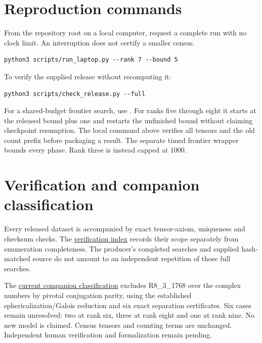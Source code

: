 \documentclass[11pt,a4paper]{article}
\theoremstyle{definition}\newtheorem{definition}[theorem]{Definition}\newtheorem{remark}[theorem]{Remark}
\begin{document}
\par\noindent\begin{minipage}{\linewidth}
\section{Reproduction commands}
From the repository root on a local computer, request a complete run with no clock limit. An interruption does not certify a smaller census.
\par\noindent\begin{minipage}{\linewidth}
\begin{lstlisting}
python3 scripts/run_laptop.py --rank 7 --bound 5
\end{lstlisting}
\end{minipage}\par
To verify the supplied release without recomputing it:
\par\noindent\begin{minipage}{\linewidth}
\begin{lstlisting}
python3 scripts/check_release.py --full
\end{lstlisting}
\end{minipage}\par
For a shared-budget frontier search, use . For ranks five through eight it starts at the released bound plus one and restarts the unfinished bound without claiming checkpoint resumption. The local command above verifies all tensors and the old count prefix before packaging a result. The separate timed frontier wrapper bounds every phase. Rank three is instead capped at 1000.

\end{minipage}\par
\section{Verification and companion classification}

Every released dataset is accompanied by exact tensor-axiom, uniqueness and
checksum checks. The \href{https://github.com/sebastienpalcoux/fusion-ring-census/blob/main/verification/README.md}{verification index}
records their scope separately from enumeration completeness. The producer's
completed searches and supplied hash-matched source do not amount to an
independent repetition of those full searches.

The \href{https://github.com/sebastienpalcoux/grothendieck-ring-classification/blob/main/evidence/frontier/README.md}{current companion classification}
excludes R8\_3\_1768 over the complex numbers by pivotal conjugation parity,
using the established sphericalization/Galois reduction and six exact
separation certificates. Six cases remain unresolved: two at rank six, three at rank eight and one at rank nine. No new model is claimed. Census
tensors and counting terms are unchanged. Independent human verification
and formalization remain pending.
\end{document}
